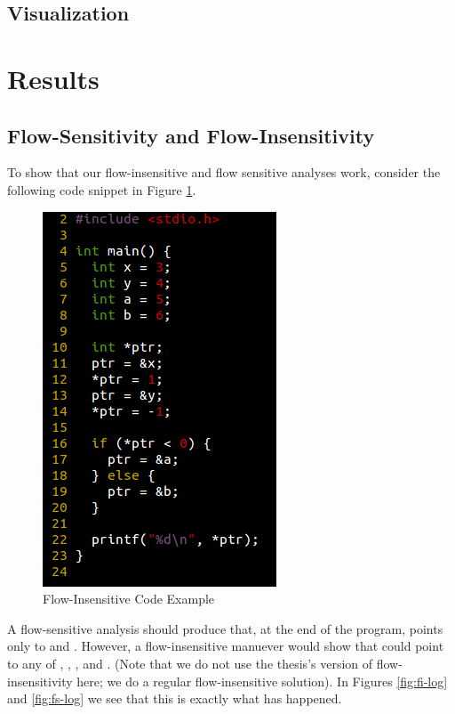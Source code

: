 \subsection{Visualization}





\section{Results}

\subsection{Flow-Sensitivity and Flow-Insensitivity}
To show that our flow-insensitive and flow sensitive analyses work, consider the following code
snippet in Figure \ref{fig:fi-code}.

\begin{figure}
\begin{center}
\leavevmode
\includegraphics[scale=0.5]{images/fi_example_code.png}
\end{center}
\caption{Flow-Insensitive Code Example}
\label{fig:fi-code}
\end{figure}

A flow-sensitive analysis should produce that, at the end of the program,
 points only to  and . However, a flow-insensitive
manuever would show that  could point to any of , ,
, and . (Note that we do not use the thesis's version of flow-
insensitivity here; we do a regular flow-insensitive solution). In Figures
\ref{fig:fi-log} and \ref{fig:fs-log} we see that this is exactly what has
happened.

